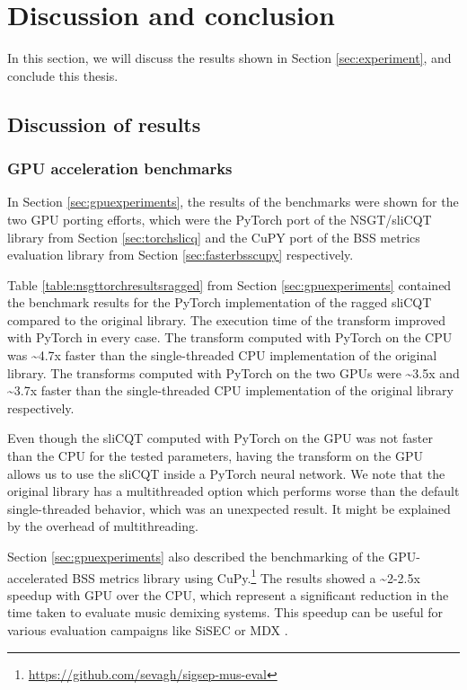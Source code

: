 \documentclass[report.tex]{subfiles}
\begin{document}
\section{Discussion and conclusion}

In this section, we will discuss the results shown in Section \ref{sec:experiment}, and conclude this thesis.

\subsection{Discussion of results}
\label{sec:discussion}

\subsubsection{GPU acceleration benchmarks}

In Section \ref{sec:gpuexperiments}, the results of the benchmarks were shown for the two GPU porting efforts, which were the PyTorch port of the NSGT/sliCQT library from Section \ref{sec:torchslicq} and the CuPY port of the BSS metrics evaluation library from Section \ref{sec:fasterbsscupy} respectively.

Table \ref{table:nsgttorchresultsragged} from Section \ref{sec:gpuexperiments} contained the benchmark results for the PyTorch implementation of the ragged sliCQT compared to the original library. The execution time of the transform improved with PyTorch in every case. The transform computed with PyTorch on the CPU was \textasciitilde4.7x faster than the single-threaded CPU implementation of the original library. The transforms computed with PyTorch on the two GPUs were \textasciitilde3.5x and \textasciitilde3.7x faster than the single-threaded CPU implementation of the original library respectively.

Even though the sliCQT computed with PyTorch on the GPU was not faster than the CPU for the tested parameters, having the transform on the GPU allows us to use the sliCQT inside a PyTorch neural network. We note that the original library has a multithreaded option which performs worse than the default single-threaded behavior, which was an unexpected result. It might be explained by the overhead of multithreading.

Section \ref{sec:gpuexperiments} also described the benchmarking of the GPU-accelerated BSS metrics library using CuPy.\footnote{\url{https://github.com/sevagh/sigsep-mus-eval}} The results showed a \textasciitilde2-2.5x speedup with GPU over the CPU, which represent a significant reduction in the time taken to evaluate music demixing systems. This speedup can be useful for various evaluation campaigns like SiSEC \parencite{sisec2018} or MDX \parencite{mdx21}.
\end{document}
